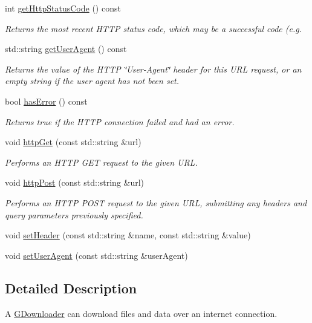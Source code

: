 \begin{DoxyCompactItemize}
int \mbox{\hyperlink{classGDownloader_ab6c069ef77f1319830dcfd90eed6a2ce}{get\+Http\+Status\+Code}} () const
\begin{DoxyCompactList}\small\item\em Returns the most recent H\+T\+TP status code, which may be a successful code (e.\+g. \end{DoxyCompactList}\item 
std\+::string \mbox{\hyperlink{classGDownloader_a479f109234aad1c792be804bf6320c62}{get\+User\+Agent}} () const
\begin{DoxyCompactList}\small\item\em Returns the value of the H\+T\+TP \char`\"{}\+User-\/\+Agent\char`\"{} header for this U\+RL request, or an empty string if the user agent has not been set. \end{DoxyCompactList}\item 
bool \mbox{\hyperlink{classGDownloader_a81dd125e253592aaef5fea33dfc50c42}{has\+Error}} () const
\begin{DoxyCompactList}\small\item\em Returns true if the H\+T\+TP connection failed and had an error. \end{DoxyCompactList}\item 
void \mbox{\hyperlink{classGDownloader_a4bafb98a98bc6edc2403a3734c985618}{http\+Get}} (const std\+::string \&url)
\begin{DoxyCompactList}\small\item\em Performs an H\+T\+TP G\+ET request to the given U\+RL. \end{DoxyCompactList}\item 
void \mbox{\hyperlink{classGDownloader_a68ec0a089bf1b625b86753545e952a57}{http\+Post}} (const std\+::string \&url)
\begin{DoxyCompactList}\small\item\em Performs an H\+T\+TP P\+O\+ST request to the given U\+RL, submitting any headers and query parameters previously specified. \end{DoxyCompactList}\item 
void \mbox{\hyperlink{classGDownloader_af7065da3945b84ffb547b8bad9ddf8dc}{set\+Header}} (const std\+::string \&name, const std\+::string \&value)
\item 
void \mbox{\hyperlink{classGDownloader_a766286050e9b8fe08919f8353ecb4031}{set\+User\+Agent}} (const std\+::string \&user\+Agent)
\end{DoxyCompactItemize}


\subsection{Detailed Description}
A \mbox{\hyperlink{classGDownloader}{G\+Downloader}} can download files and data over an internet connection. 

